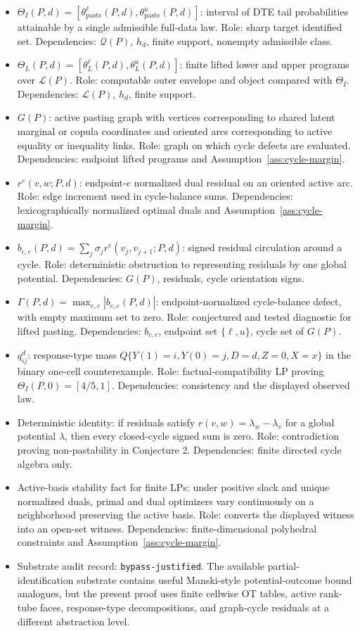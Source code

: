 \documentclass[11pt]{article}
\theoremstyle{definition}
\theoremstyle{plain}
\theoremstyle{remark}
\begin{document}
\begin{itemize}[leftmargin=*]
\item \(\Theta_I(P,d)=[\theta_{\mathrm{paste}}^\ell(P,d),\theta_{\mathrm{paste}}^u(P,d)]\): interval of DTE tail probabilities attainable by a single admissible full-data law.  Role: sharp target identified set.  Dependencies: \(\mathcal Q(P)\), \(h_d\), finite support, nonempty admissible class.
\item \(\Theta_L(P,d)=[\theta_L^\ell(P,d),\theta_L^u(P,d)]\): finite lifted lower and upper programs over \(\mathcal L(P)\).  Role: computable outer envelope and object compared with \(\Theta_I\).  Dependencies: \(\mathcal L(P)\), \(h_d\), finite support.
\item \(G(P)\): active pasting graph with vertices corresponding to shared latent marginal or copula coordinates and oriented arcs corresponding to active equality or inequality links.  Role: graph on which cycle defects are evaluated.  Dependencies: endpoint lifted programs and Assumption~\ref{ass:cycle-margin}.
\item \(r^e(v,w;P,d)\): endpoint-\(e\) normalized dual residual on an oriented active arc.  Role: edge increment used in cycle-balance sums.  Dependencies: lexicographically normalized optimal duals and Assumption~\ref{ass:cycle-margin}.
\item \(b_{c,e}(P,d)=\sum_j\sigma_j r^e(v_j,v_{j+1};P,d)\): signed residual circulation around a cycle.  Role: deterministic obstruction to representing residuals by one global potential.  Dependencies: \(G(P)\), residuals, cycle orientation signs.
\item \(\Gamma(P,d)=\max_{e,c}|b_{c,e}(P,d)|\): endpoint-normalized cycle-balance defect, with empty maximum set to zero.  Role: conjectured and tested diagnostic for lifted pasting.  Dependencies: \(b_{c,e}\), endpoint set \(\{\ell,u\}\), cycle set of \(G(P)\).
\item \(q^d_{ij}\): response-type mass \(Q\{Y(1)=i,Y(0)=j,D=d,Z=0,X=x\}\) in the binary one-cell counterexample.  Role: factual-compatibility LP proving \(\Theta_I(P,0)=[4/5,1]\).  Dependencies: consistency and the displayed observed law.
\item Deterministic identity: if residuals satisfy \(r(v,w)=\lambda_w-\lambda_v\) for a global potential \(\lambda\), then every closed-cycle signed sum is zero.  Role: contradiction proving non-pastability in Conjecture 2.  Dependencies: finite directed cycle algebra only.
\item Active-basis stability fact for finite LPs: under positive slack and unique normalized duals, primal and dual optimizers vary continuously on a neighborhood preserving the active basis.  Role: converts the displayed witness into an open-set witness.  Dependencies: finite-dimensional polyhedral constraints and Assumption~\ref{ass:cycle-margin}.
\item Substrate audit record: \texttt{bypass-justified}.  The available partial-identification substrate contains useful Manski-style potential-outcome bound analogues, but the present proof uses finite cellwise OT tables, active rank-tube faces, response-type decompositions, and graph-cycle residuals at a different abstraction level.
\end{itemize}
\end{document}
